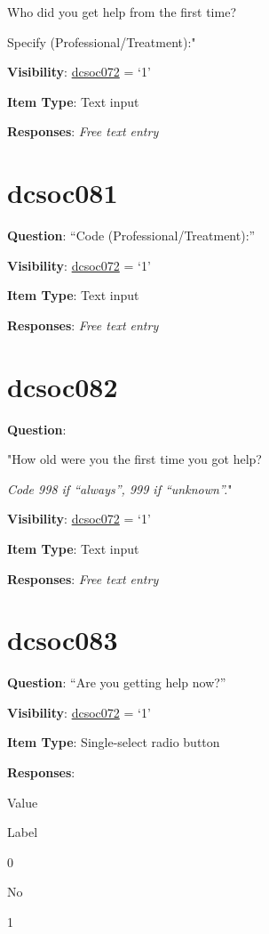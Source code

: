 \documentclass[]{book}
\begin{document}
Who did you get help from the first time?

Specify (Professional/Treatment):"

\textbf{Visibility}: \protect\hyperlink{dcsoc072}{dcsoc072} = `1'

\textbf{Item Type}: Text input

\textbf{Responses}: \emph{Free text entry}

\hypertarget{dcsoc081}{%
\section{dcsoc081}\label{dcsoc081}}

\textbf{Question}: ``Code (Professional/Treatment):''

\textbf{Visibility}: \protect\hyperlink{dcsoc072}{dcsoc072} = `1'

\textbf{Item Type}: Text input

\textbf{Responses}: \emph{Free text entry}

\hypertarget{dcsoc082}{%
\section{dcsoc082}\label{dcsoc082}}

\textbf{Question}:

"How old were you the first time you got help?

\emph{Code 998 if ``always'', 999 if ``unknown''.}"

\textbf{Visibility}: \protect\hyperlink{dcsoc072}{dcsoc072} = `1'

\textbf{Item Type}: Text input

\textbf{Responses}: \emph{Free text entry}

\hypertarget{dcsoc083}{%
\section{dcsoc083}\label{dcsoc083}}

\textbf{Question}: ``Are you getting help now?''

\textbf{Visibility}: \protect\hyperlink{dcsoc072}{dcsoc072} = `1'

\textbf{Item Type}: Single-select radio button

\textbf{Responses}:

Value

Label

0

No

1
\end{document}

